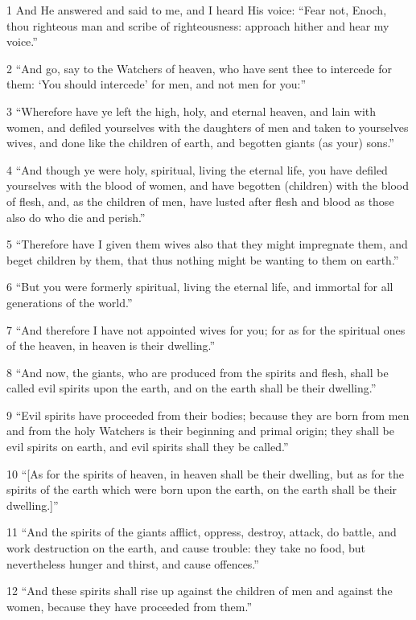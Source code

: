 \par 1 And He answered and said to me, and I heard His voice: “Fear not, Enoch, thou righteous man and scribe of righteousness: approach hither and hear my voice.”
\par 2 “And go, say to the Watchers of heaven, who have sent thee to intercede for them: ‘You should intercede’ for men, and not men for you:”
\par 3 “Wherefore have ye left the high, holy, and eternal heaven, and lain with women, and defiled yourselves with the daughters of men and taken to yourselves wives, and done like the children of earth, and begotten giants (as your) sons.”
\par 4 “And though ye were holy, spiritual, living the eternal life, you have defiled yourselves with the blood of women, and have begotten (children) with the blood of flesh, and, as the children of men, have lusted after flesh and blood as those also do who die and perish.”
\par 5 “Therefore have I given them wives also that they might impregnate them, and beget children by them, that thus nothing might be wanting to them on earth.”
\par 6 “But you were formerly spiritual, living the eternal life, and immortal for all generations of the world.”
\par 7 “And therefore I have not appointed wives for you; for as for the spiritual ones of the heaven, in heaven is their dwelling.”
\par 8 “And now, the giants, who are produced from the spirits and flesh, shall be called evil spirits upon the earth, and on the earth shall be their dwelling.”
\par 9 “Evil spirits have proceeded from their bodies; because they are born from men and from the holy Watchers is their beginning and primal origin; they shall be evil spirits on earth, and evil spirits shall they be called.”
\par 10 “[As for the spirits of heaven, in heaven shall be their dwelling, but as for the spirits of the earth which were born upon the earth, on the earth shall be their dwelling.]”
\par 11 “And the spirits of the giants afflict, oppress, destroy, attack, do battle, and work destruction on the earth, and cause trouble: they take no food, but nevertheless hunger and thirst, and cause offences.”
\par 12 “And these spirits shall rise up against the children of men and against the women, because they have proceeded from them.”

